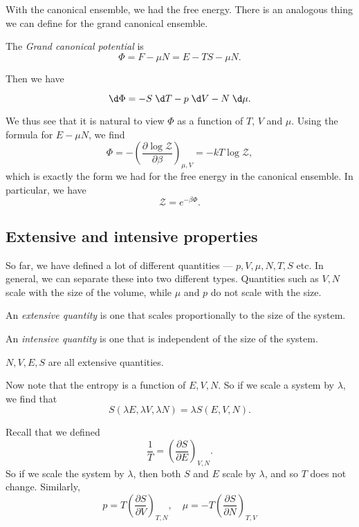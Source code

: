 \documentclass[a4paper]{article}
\begin{document}
With the canonical ensemble, we had the free energy. There is an analogous thing we can define for the grand canonical ensemble.
\begin{defi}\index{$\Phi$}
  The \emph{Grand canonical potential} is
  \[
    \Phi = F - \mu N = E - TS - \mu N.
  \]
\end{defi}
Then we have
\begin{prop}
  \[
    \d \Phi = - S \;\d T - p \;\d V - N \;\d \mu.
  \]
\end{prop}
We thus see that it is natural to view $\Phi$ as a function of $T$, $V$ and $\mu$. Using the formula for $E - \mu N$, we find
\[
  \Phi = - \left(\frac{\partial \log \mathcal{Z}}{ \partial \beta}\right)_{\mu, V} = -kT \log \mathcal{Z},
\]
which is exactly the form we had for the free energy in the canonical ensemble. In particular, we have
\[
  \mathcal{Z} = e^{-\beta \Phi}.
\]
\subsection{Extensive and intensive properties}
So far, we have defined a lot of different quantities --- $p, V, \mu, N, T, S$ etc. In general, we can separate these into two different types. Quantities such as $V, N$ scale with the size of the volume, while $\mu$ and $p$ do not scale with the size.

\begin{defi}
  An \emph{extensive quantity} is one that scales proportionally to the size of the system.
\end{defi}

\begin{defi}
  An \emph{intensive quantity} is one that is independent of the size of the system.
\end{defi}

\begin{eg}
  $N, V, E, S$ are all extensive quantities.
\end{eg}

Now note that the entropy is a function of $E, V, N$. So if we scale a system by $\lambda$, we find that
\[
  S(\lambda E, \lambda V, \lambda N) = \lambda S(E, V, N).
\]
\begin{eg}
  Recall that we defined
  \[
    \frac{1}{T} = \left(\frac{\partial S}{\partial E}\right)_{V, N}.
  \]
  So if we scale the system by $\lambda$, then both $S$ and $E$ scale by $\lambda$, and so $T$ does not change. Similarly,
  \[
    p = T \left(\frac{\partial S}{\partial V}\right)_{T, N},\quad \mu = -T \left(\frac{\partial S}{\partial N}\right)_{T, V}
  \]
\end{eg}
\end{document}
